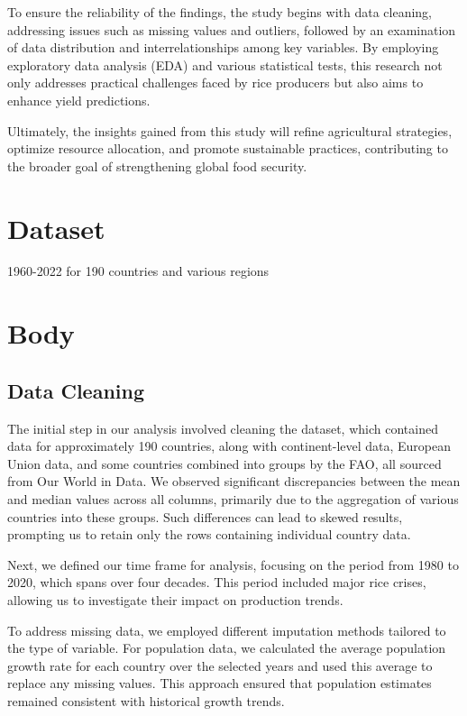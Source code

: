 \documentclass[
  man]{apa6}
\begin{document}
To ensure the reliability of the findings, the study begins with data cleaning, addressing issues such as missing values and outliers, followed by an examination of data distribution and interrelationships among key variables. By employing exploratory data analysis (EDA) and various statistical tests, this research not only addresses practical challenges faced by rice producers but also aims to enhance yield predictions.

Ultimately, the insights gained from this study will refine agricultural strategies, optimize resource allocation, and promote sustainable practices, contributing to the broader goal of strengthening global food security.

\section{Dataset}\label{dataset}

1960-2022 for 190 countries and various regions

\section{Body}\label{body}

\subsection{Data Cleaning}\label{data-cleaning}

The initial step in our analysis involved cleaning the dataset, which contained data for approximately 190 countries, along with continent-level data, European Union data, and some countries combined into groups by the FAO, all sourced from Our World in Data. We observed significant discrepancies between the mean and median values across all columns, primarily due to the aggregation of various countries into these groups. Such differences can lead to skewed results, prompting us to retain only the rows containing individual country data.

Next, we defined our time frame for analysis, focusing on the period from 1980 to 2020, which spans over four decades. This period included major rice crises, allowing us to investigate their impact on production trends.

To address missing data, we employed different imputation methods tailored to the type of variable. For population data, we calculated the average population growth rate for each country over the selected years and used this average to replace any missing values. This approach ensured that population estimates remained consistent with historical growth trends.
\end{document}
